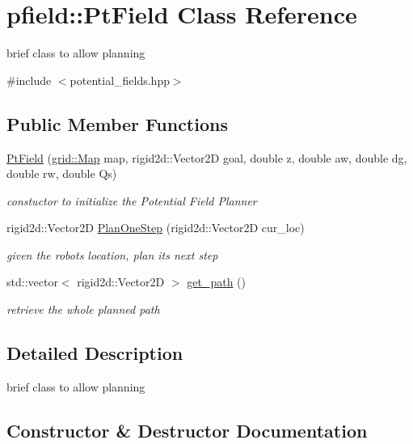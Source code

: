 \hypertarget{classpfield_1_1PtField}{}\section{pfield\+:\+:Pt\+Field Class Reference}
\label{classpfield_1_1PtField}


brief class to allow planning  




{\ttfamily \#include $<$potential\+\_\+fields.\+hpp$>$}

\subsection*{Public Member Functions}
\begin{DoxyCompactItemize}
\item 
\hyperlink{classpfield_1_1PtField_aee7dcc713ac6d16364e8bebe2da64681}{Pt\+Field} (\hyperlink{structgrid_1_1Map}{grid\+::\+Map} map, rigid2d\+::\+Vector2D goal, double z, double aw, double dg, double rw, double Qs)
\begin{DoxyCompactList}\small\item\em constuctor to initialize the Potential Field Planner \end{DoxyCompactList}\item 
rigid2d\+::\+Vector2D \hyperlink{classpfield_1_1PtField_af1faea5a1127d6df5e06727391227ade}{Plan\+One\+Step} (rigid2d\+::\+Vector2D cur\+\_\+loc)
\begin{DoxyCompactList}\small\item\em given the robots location, plan its next step \end{DoxyCompactList}\item 
std\+::vector$<$ rigid2d\+::\+Vector2D $>$ \hyperlink{classpfield_1_1PtField_ab936f2bf686f45a2a11825e5a8911356}{get\+\_\+path} ()
\begin{DoxyCompactList}\small\item\em retrieve the whole planned path \end{DoxyCompactList}\end{DoxyCompactItemize}


\subsection{Detailed Description}
brief class to allow planning 

\subsection{Constructor \& Destructor Documentation}
\mbox{\label{classpfield_1_1PtField_aee7dcc713ac6d16364e8bebe2da64681}} 
